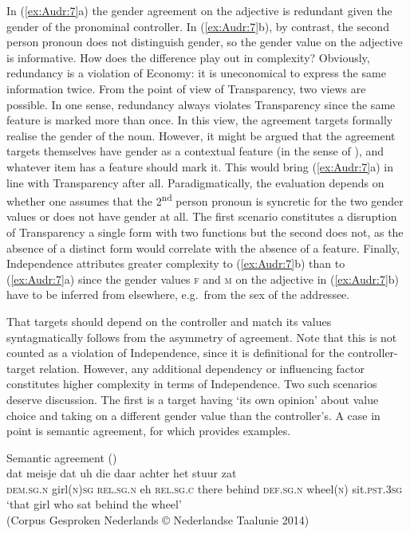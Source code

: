 \documentclass[output=collectionpaper]{langsci/langscibook}
\begin{document}
In (\ref{ex:Audr:7}a) the gender agreement on the adjective is redundant given the gender of the pronominal controller. In (\ref{ex:Audr:7}b), by contrast, the second person pronoun does not distinguish gender, so the gender value on the adjective is informative. How does the difference play out in complexity? Obviously, redundancy is a violation of Economy: it is uneconomical to express the same information twice. From the point of view of Transparency, two views are possible. In one sense, redundancy always violates Transparency since the same feature is marked more than once. In this view, the agreement targets formally realise the gender of the noun. However, it might be argued that the agreement targets themselves have gender as a contextual feature (in the sense of \citealt{Booij1996}), and whatever item has a feature should mark it. This would bring (\ref{ex:Audr:7}a) in line with Transparency after all. Paradigmatically, the evaluation depends on whether one assumes that the  2\textsuperscript{nd} person pronoun is syncretic for the two gender values or does not have gender at all. The first scenario constitutes a disruption of Transparency \textendash{} a single form with two functions \textendash{} but the second does not, as the absence of a distinct form would correlate with the absence of a feature. Finally, Independence attributes greater complexity to (\ref{ex:Audr:7}b) than to (\ref{ex:Audr:7}a) since the gender values \textsc{f} and \textsc{m} on the adjective in (\ref{ex:Audr:7}b) have to be inferred from elsewhere, e.g.\ from the sex of the addressee.

That targets should depend on the controller and match its values syntagmatically follows from the asymmetry of agreement. Note that this is not counted as a violation of Independence, since it is definitional for the controller-target relation. However, any additional dependency or influencing factor constitutes higher complexity in terms of Independence. Two such scenarios deserve discussion. The first is a target having `its own opinion' about value choice and taking on a different gender value than the controller's. A case in point is semantic agreement, for which  provides examples.

\ea
\label{ex:Audr:8}
Semantic agreement ()\\
\gll dat meisje dat uh die daar achter het stuur zat\\
     \textsc{dem.sg.n} girl(\textsc{n})\textsc{sg} \textsc{rel.sg.n} eh \textsc{rel.sg.c} there behind \textsc{def.sg.n} wheel(\textsc{n}) sit.\textsc{pst.3sg}\\
\glt `that girl who sat behind the wheel'\\
(Corpus Gesproken Nederlands © Nederlandse Taalunie 2014)
\z
\end{document}
